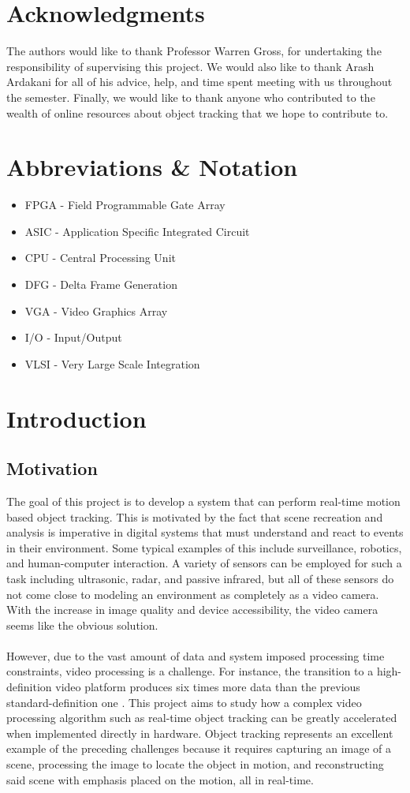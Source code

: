 \documentclass[12pt]{article} %
\begin{document}
\section*{Acknowledgments}
The authors would like to thank Professor Warren Gross, for undertaking the responsibility of supervising this project. We would also like to thank Arash Ardakani for all of his advice, help, and time spent meeting with us throughout the semester. Finally, we would like to thank anyone who contributed to the wealth of online resources about object tracking that we hope to contribute to.
\pagebreak
\tableofcontents
\pagebreak
\section{Abbreviations \& Notation}
\begin{itemize}
\item[] FPGA - Field Programmable Gate Array
\item[] ASIC - Application Specific Integrated Circuit
\item[] CPU - Central Processing Unit
\item[] DFG - Delta Frame Generation
\item[] VGA - Video Graphics Array
\item[] I/O - Input/Output
\item[] VLSI - Very Large Scale Integration
\end{itemize}
\section{Introduction}
\label{sec:intro}
\subsection{Motivation}
The goal of this project is to develop a system that can perform real-time motion based object tracking. This is motivated by the fact that scene recreation and analysis is imperative in digital systems that must understand and react to events in their environment. Some typical examples of this include surveillance, robotics, and human-computer interaction. A variety of sensors can be employed for such a task including ultrasonic, radar, and passive infrared, but all of these sensors do not come close to modeling an environment as completely as a video camera. With the increase in image quality and device accessibility, the video camera seems like the obvious solution. \\\\
However, due to the vast amount of data and system imposed processing time constraints, video processing is a challenge. For instance, the transition to a high-definition video platform produces six times more data than the previous standard-definition one \cite{3}. This project aims to study how a complex video processing algorithm such as real-time object tracking can be greatly accelerated when implemented directly in hardware. Object tracking represents an excellent example of the preceding challenges because it requires capturing an image of a scene, processing the image to locate the object in motion, and reconstructing said scene with emphasis placed on the motion, all in real-time.
\end{document}

